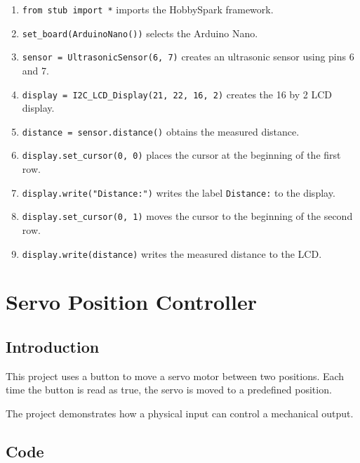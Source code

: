 \begin{enumerate}
    \item \texttt{from stub import *} imports the HobbySpark framework.

    \item \texttt{set\_board(ArduinoNano())} selects the Arduino Nano.

    \item \texttt{sensor = UltrasonicSensor(6, 7)} creates an ultrasonic
    sensor using pins 6 and 7.

    \item \texttt{display = I2C\_LCD\_Display(21, 22, 16, 2)} creates the
    16 by 2 LCD display.

    \item \texttt{distance = sensor.distance()} obtains the measured distance.

    \item \texttt{display.set\_cursor(0, 0)} places the cursor at the
    beginning of the first row.

    \item \texttt{display.write("Distance:")} writes the label
    \texttt{Distance:} to the display.

    \item \texttt{display.set\_cursor(0, 1)} moves the cursor to the
    beginning of the second row.

    \item \texttt{display.write(distance)} writes the measured distance
    to the LCD.
\end{enumerate}


\newpage

\section{Servo Position Controller}

\subsection{Introduction}

This project uses a button to move a servo motor between two positions.
Each time the button is read as true, the servo is moved to a predefined
position.

The project demonstrates how a physical input can control a mechanical
output.

\subsection{Code}

